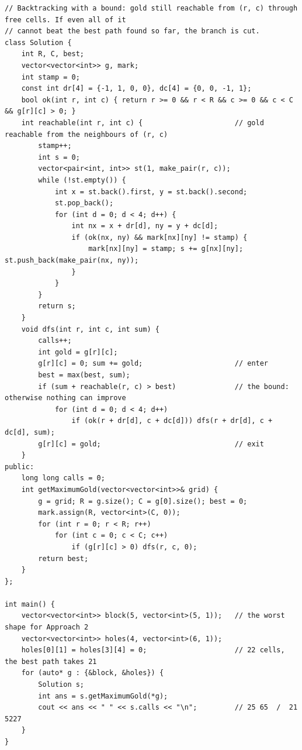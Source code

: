 \begin{tricksbox}
\begin{lstlisting}[style=cpp]
// Backtracking with a bound: gold still reachable from (r, c) through free cells. If even all of it
// cannot beat the best path found so far, the branch is cut.
class Solution {
    int R, C, best;
    vector<vector<int>> g, mark;
    int stamp = 0;
    const int dr[4] = {-1, 1, 0, 0}, dc[4] = {0, 0, -1, 1};
    bool ok(int r, int c) { return r >= 0 && r < R && c >= 0 && c < C && g[r][c] > 0; }
    int reachable(int r, int c) {                      // gold reachable from the neighbours of (r, c)
        stamp++;
        int s = 0;
        vector<pair<int, int>> st(1, make_pair(r, c));
        while (!st.empty()) {
            int x = st.back().first, y = st.back().second;
            st.pop_back();
            for (int d = 0; d < 4; d++) {
                int nx = x + dr[d], ny = y + dc[d];
                if (ok(nx, ny) && mark[nx][ny] != stamp) {
                    mark[nx][ny] = stamp; s += g[nx][ny]; st.push_back(make_pair(nx, ny));
                }
            }
        }
        return s;
    }
    void dfs(int r, int c, int sum) {
        calls++;
        int gold = g[r][c];
        g[r][c] = 0; sum += gold;                      // enter
        best = max(best, sum);
        if (sum + reachable(r, c) > best)              // the bound: otherwise nothing can improve
            for (int d = 0; d < 4; d++)
                if (ok(r + dr[d], c + dc[d])) dfs(r + dr[d], c + dc[d], sum);
        g[r][c] = gold;                                // exit
    }
public:
    long long calls = 0;
    int getMaximumGold(vector<vector<int>>& grid) {
        g = grid; R = g.size(); C = g[0].size(); best = 0;
        mark.assign(R, vector<int>(C, 0));
        for (int r = 0; r < R; r++)
            for (int c = 0; c < C; c++)
                if (g[r][c] > 0) dfs(r, c, 0);
        return best;
    }
};

int main() {
    vector<vector<int>> block(5, vector<int>(5, 1));   // the worst shape for Approach 2
    vector<vector<int>> holes(4, vector<int>(6, 1));
    holes[0][1] = holes[3][4] = 0;                     // 22 cells, the best path takes 21
    for (auto* g : {&block, &holes}) {
        Solution s;
        int ans = s.getMaximumGold(*g);
        cout << ans << " " << s.calls << "\n";         // 25 65  /  21 5227
    }
}
\end{lstlisting}


\end{tricksbox}
